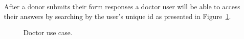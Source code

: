 After a donor submits their form responses a doctor user will be able to access their answers by searching by the user's unique id as presented in Figure~\ref{fig:doctor_use_case}.

\begin{figure}[H]
	\begin{center}
	\end{center}
	\caption{Doctor use case.}\label{fig:doctor_use_case}
\end{figure}

